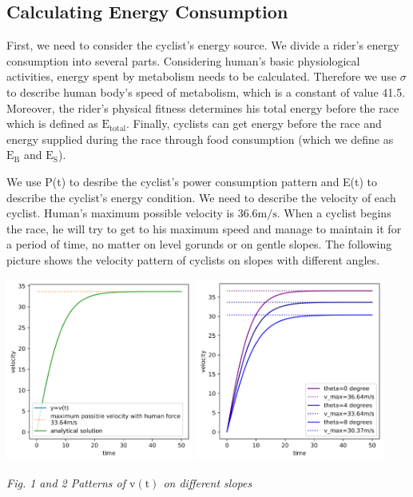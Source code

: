 \documentclass{article}
\begin{document}
	\subsection{Calculating Energy Consumption}
	First, we need to consider the cyclist's energy source. We divide a rider's energy consumption into several parts. Considering human's basic physiological activities, energy spent by metabolism needs to be calculated. Therefore we use $\sigma$ to describe human body's speed of metabolism, which is a constant of value 41.5. Moreover, the rider's physical fitness determines his total energy before the race which is defined as $\mathrm{E}_\mathrm{total}$. Finally, cyclists can get energy before the race and energy supplied during the race through food consumption (which we define as $\mathrm{E}_\mathrm{B}$ and $\mathrm{E}_\mathrm{S}$).

	We use P(t) to desribe the cyclist's power consumption pattern and E(t) to describe the cyclist's energy condition. We need to describe the velocity of each cyclist. Human's maximum possible velocity is 36.6$\mathrm{m/s}$. When a cyclist begins the race, he will try to get to his maximum speed and manage to maintain it for a period of time, no matter on level gorunds or on gentle slopes. The following picture shows the velocity pattern of cyclists on slopes with different angles.
	\begin{center}
		\includegraphics[height=6cm]{1.png}
		\includegraphics[height=6cm]{2.png}

		\small \textit{Fig. 1 and 2 Patterns of $\mathrm{v}(\mathrm{t})$ on different slopes}
	\end{center}
\end{document}
